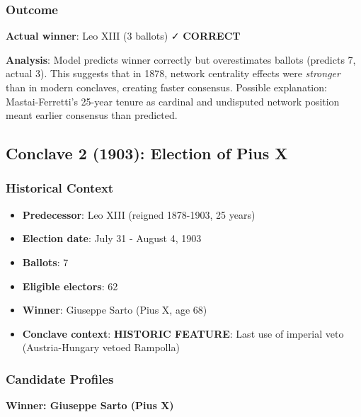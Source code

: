 \documentclass[11pt,a4paper]{article}
\begin{document}
\subsubsection{Outcome}

\textbf{Actual winner}: Leo XIII (3 ballots) ✓ \textbf{CORRECT}

\textbf{Analysis}: Model predicts winner correctly but overestimates ballots (predicts 7, actual 3). This suggests that in 1878, network centrality effects were \textit{stronger} than in modern conclaves, creating faster consensus. Possible explanation: Mastai-Ferretti's 25-year tenure as cardinal and undisputed network position meant earlier consensus than predicted.


\subsection{Conclave 2 (1903): Election of Pius X}

\subsubsection{Historical Context}

\begin{itemize}
    \item \textbf{Predecessor}: Leo XIII (reigned 1878-1903, 25 years)
    \item \textbf{Election date}: July 31 - August 4, 1903
    \item \textbf{Ballots}: 7
    \item \textbf{Eligible electors}: 62
    \item \textbf{Winner}: Giuseppe Sarto (Pius X, age 68)
    \item \textbf{Conclave context}: \textbf{HISTORIC FEATURE}: Last use of imperial veto (Austria-Hungary vetoed Rampolla)
\end{itemize}

\subsubsection{Candidate Profiles}

\textbf{Winner: Giuseppe Sarto (Pius X)}
\end{document}

